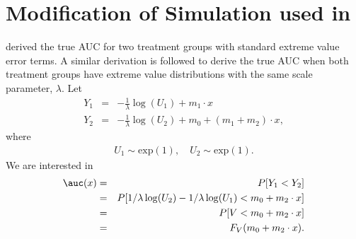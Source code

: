 
\appendix 
\section{Modification of Simulation used in \cite{Zhang_Zhao_Tubbs_2011} }\label{sec: Appendix A}
%

\cite{Balakrishnan_Nevzorov} derived the true AUC for two treatment groups with standard extreme value error terms. A similar derivation is followed to derive the true AUC when both treatment groups have extreme value distributions with the same scale parameter, $\lambda.$ Let
\begin{eqnarray*}
Y_1 &=& -\frac{1}{\lambda}\log(U_1) + m_1 \cdot x \\
Y_2 &=& -\frac{1}{\lambda}\log(U_2) + m_0 + (m_1+m_2) \cdot x,
\end{eqnarray*}
where
\begin{eqnarray*}
U_1 \sim \text{exp}(1), \quad U_2 \sim \text{exp}(1).
\end{eqnarray*}
We are interested in
\begin{eqnarray*}
\auc(x) &=& P[Y_1 < Y_2] \\
&=& P[ 1/\lambda \log(U_2) - 1/\lambda \log(U_1) < m_0 + m_2 \cdot x] \\
&=& P[ V <  m_0 + m_2 \cdot x ] \\
&=& F_V(m_0 + m_2 \cdot x).
\end{eqnarray*}

